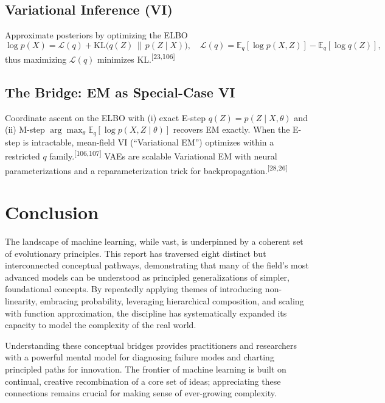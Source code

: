 \documentclass[11pt]{article}
\newcommand{\refnum}[1]{\textsuperscript{[#1]}}
\begin{document}
\subsection{Variational Inference (VI)}
Approximate posteriors by optimizing the ELBO
\[
\log p(X)=\mathcal{L}(q)+\mathrm{KL}\!\big(q(Z)\,\|\,p(Z\mid X)\big),\quad
\mathcal{L}(q)=\mathbb{E}_q[\log p(X,Z)]-\mathbb{E}_q[\log q(Z)],
\]
thus maximizing $\mathcal{L}(q)$ minimizes KL.\refnum{23,106}

\subsection{The Bridge: EM as Special-Case VI}
Coordinate ascent on the ELBO with (i) exact E-step $q(Z)=p(Z\mid X,\theta)$ and (ii) M-step $\arg\max_\theta\mathbb{E}_q[\log p(X,Z\mid\theta)]$ recovers EM exactly. When the E-step is intractable, mean-field VI (``Variational EM'') optimizes within a restricted $q$ family.\refnum{106,107} VAEs are scalable Variational EM with neural parameterizations and a reparameterization trick for backpropagation.\refnum{28,26}

\section*{Conclusion}
The landscape of machine learning, while vast, is underpinned by a coherent set of evolutionary principles. This report has traversed eight distinct but interconnected conceptual pathways, demonstrating that many of the field's most advanced models can be understood as principled generalizations of simpler, foundational concepts. By repeatedly applying themes of introducing non-linearity, embracing probability, leveraging hierarchical composition, and scaling with function approximation, the discipline has systematically expanded its capacity to model the complexity of the real world.

Understanding these conceptual bridges provides practitioners and researchers with a powerful mental model for diagnosing failure modes and charting principled paths for innovation. The frontier of machine learning is built on continual, creative recombination of a core set of ideas; appreciating these connections remains crucial for making sense of ever-growing complexity.
\end{document}

